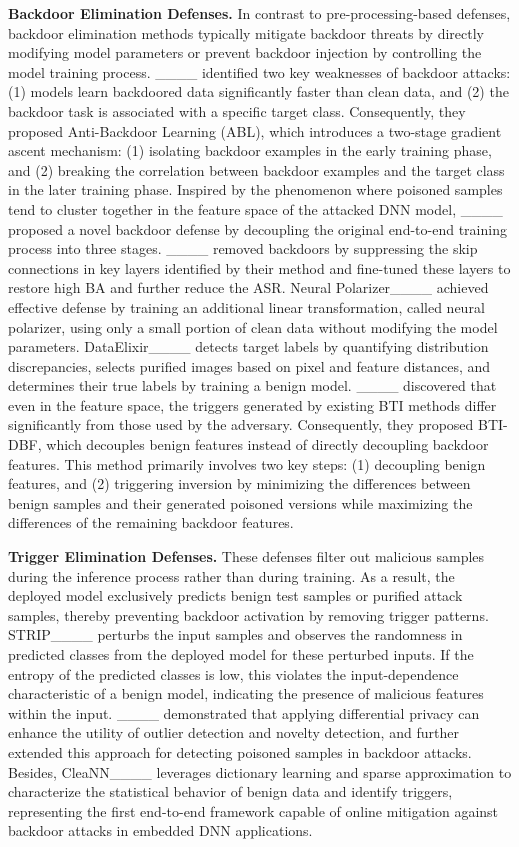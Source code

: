 \textbf{Backdoor Elimination Defenses.}
In contrast to pre-processing-based defenses, backdoor elimination methods typically mitigate backdoor threats by directly modifying model parameters or prevent backdoor injection by controlling the model training process. ____ identified two key weaknesses of backdoor attacks: (1) models learn backdoored data significantly faster than clean data, and (2) the backdoor task is associated with a specific target class. Consequently, they proposed Anti-Backdoor Learning (ABL), which introduces a two-stage gradient ascent mechanism: (1) isolating backdoor examples in the early training phase, and (2) breaking the correlation between backdoor examples and the target class in the later training phase. Inspired by the phenomenon where poisoned samples tend to cluster together in the feature space of the attacked DNN model, ____ proposed a novel backdoor defense by decoupling the original end-to-end training process into three stages. ____ removed backdoors by suppressing the skip connections in key layers identified by their method and fine-tuned these layers to restore high BA and further reduce the ASR. Neural Polarizer____ achieved effective defense by training an additional linear transformation, called neural polarizer, using only a small portion of clean data without modifying the model parameters. DataElixir____ detects target labels by quantifying distribution discrepancies, selects purified images based on pixel and feature distances, and determines their true labels by training a benign model. ____ discovered that even in the feature space, the triggers generated by existing BTI methods differ significantly from those used by the adversary. Consequently, they proposed BTI-DBF, which decouples benign features instead of directly decoupling backdoor features. This method primarily involves two key steps: (1) decoupling benign features, and (2) triggering inversion by minimizing the differences between benign samples and their generated poisoned versions while maximizing the differences of the remaining backdoor features.



\textbf{Trigger Elimination Defenses.}
These defenses filter out malicious samples during the inference process rather than during training. As a result, the deployed model exclusively predicts benign test samples or purified attack samples, thereby preventing backdoor activation by removing trigger patterns. STRIP____ perturbs the input samples and observes the randomness in predicted classes from the deployed model for these perturbed inputs. If the entropy of the predicted classes is low, this violates the input-dependence characteristic of a benign model, indicating the presence of malicious features within the input. ____ demonstrated that applying differential privacy can enhance the utility of outlier detection and novelty detection, and further extended this approach for detecting poisoned samples in backdoor attacks. Besides, CleaNN____ leverages dictionary learning and sparse approximation to characterize the statistical behavior of benign data and identify triggers, representing the first end-to-end framework capable of online mitigation against backdoor attacks in embedded DNN applications.

